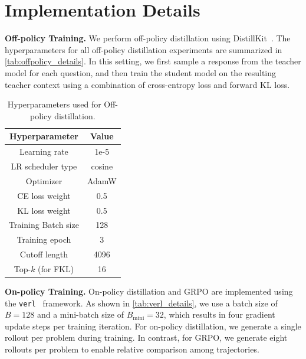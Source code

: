 
\section{Implementation Details}
\label{app:implementation_details}
\textbf{Off-policy Training.} We perform off-policy distillation using DistillKit~\cite{distillkit2024}. The hyperparameters for all off-policy distillation experiments are summarized in \autoref{tab:offpolicy_details}. In this setting, we first sample a response from the teacher model for each question, and then train the student model on the resulting teacher context using a combination of cross-entropy loss and forward KL loss.
\begin{table}[H]
\centering
\vspace{0.2cm}
\caption{Hyperparameters used for Off-policy distillation.}
\begin{tabular}{cc}
    \toprule
    \textbf{Hyperparameter} & \textbf{Value} \\
    \midrule
    Learning rate           & 1e-5 \\
    LR scheduler type       & cosine \\
    Optimizer               & AdamW \\
    CE loss weight          & 0.5 \\
    KL loss weight          & 0.5 \\
    Training Batch size              & 128 \\
    Training epoch          & 3 \\
    Cutoff length           & 4096 \\
    Top-$k$ (for FKL)       & 16 \\
    \bottomrule
\end{tabular}
\label{tab:offpolicy_details}
\end{table}


\textbf{On-policy Training.} On-policy distillation and GRPO are implemented using the \texttt{verl}~\cite{sheng2024hybridflow} framework. As shown in \autoref{tab:verl_details}, we use a batch size of $B = 128$ and a mini-batch size of $B_{\text{mini}} = 32$, which results in four gradient update steps per training iteration.
For on-policy distillation, we generate a single rollout per problem during training. In contrast, for GRPO, we generate eight rollouts per problem to enable relative comparison among trajectories.

